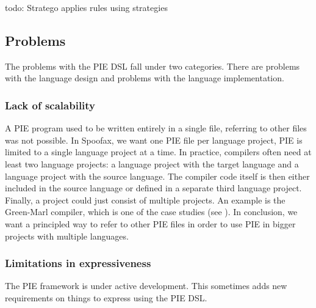 todo: Stratego applies rules using strategies

\subsection{Problems}
The problems with the PIE DSL fall under two categories.
There are problems with the language design and problems with the language implementation.

\subsubsection{Lack of scalability}
A PIE program used to be written entirely in a single file, referring to other files was not possible.
In Spoofax, we want one PIE file per language project, PIE is limited to a single language project at a time.
In practice, compilers often need at least two language projects: a language project with the target language and a language project with the source language.
The compiler code itself is then either included in the source language or defined in a separate third language project.
Finally, a project could just consist of multiple projects.
An example is the Green-Marl compiler, which is one of the case studies (see ).
In conclusion, we want a principled way to refer to other PIE files in order to use PIE in bigger projects with multiple languages.

\subsubsection{Limitations in expressiveness}
The PIE framework is under active development.
This sometimes adds new requirements on things to express using the PIE DSL.

